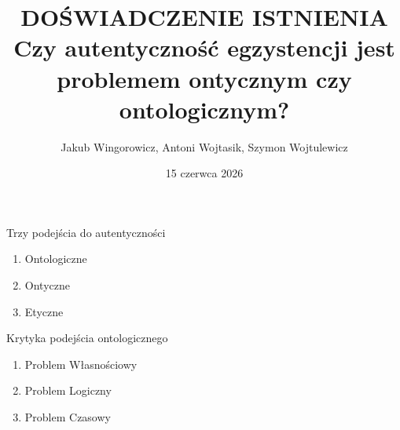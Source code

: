\documentclass{beamer}
\title[Enhanced Beamer Demo]{\Large{DOŚWIADCZENIE ISTNIENIA} \\ \vspace{1em}
Czy autentyczność egzystencji jest problemem ontycznym czy ontologicznym?}
\author{Jakub Wingorowicz, Antoni Wojtasik, Szymon Wojtulewicz}
\date{15 czerwca 2026}
\begin{document}
\frame{\titlepage}

\begin{frame}{Trzy podejścia do autentyczności}
  \huge {
    \begin{enumerate}
      \item Ontologiczne
      \item Ontyczne
      \item Etyczne
    \end{enumerate}
  }
\end{frame}

\begin{frame}{Krytyka podejścia ontologicznego}
  \huge {
    \begin{enumerate}
      \item Problem Własnościowy
      \item Problem Logiczny
      \item Problem Czasowy
    \end{enumerate}
  }
\end{frame}
\end{document}

